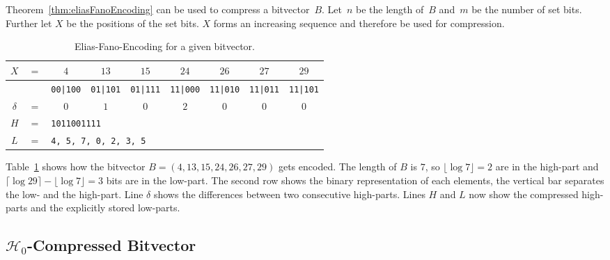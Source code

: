 Theorem~\ref{thm:eliasFanoEncoding} can be used to compress a bitvector~$B$. Let~$n$ be the length of~$B$ and~$m$ be the number of set bits. Further let $X$ be the positions of the set bits. $X$ forms an increasing sequence and therefore be used for compression.

\begin{Example}
  \begin{table}[htbp]
    \centering
    \begin{tabular}{ccccccccc}
      \toprule
      $X$ & $=$ & $4$ & $13$ & $15$ & $24$ & $26$ & $27$ & $29$ \\
      \midrule
      & &
      \texttt{00|100} &
      \texttt{01|101} &
      \texttt{01|111} &
      \texttt{11|000} &
      \texttt{11|010} &
      \texttt{11|011} &
      \texttt{11|101} \\

      $\delta$ & $=$ & $0$ & $1$ & $0$ & $2$ & $0$ & $0$ & $0$ \\
      $H$ & $=$ & \multicolumn{7}{l}{\texttt{1011001111}} \\
      $L$ & $=$ & \multicolumn{7}{l}{\texttt{4, 5, 7, 0, 2, 3, 5}} \\
      \bottomrule
    \end{tabular}
    \caption{Elias-Fano-Encoding for a given bitvector.}
    \label{tbl:eliasFanoExample}
  \end{table}
  Table~\ref{tbl:eliasFanoExample} shows how the bitvector $B=(4,13,15,24,26,27,29)$ gets encoded. The length of $B$ is $7$, so $\lfloor \log 7 \rfloor = 2$ are in the high-part and $\lceil \log 29 \rceil - \lfloor \log 7 \rfloor = 3$ bits are in the low-part. The second row shows the binary representation of each elements, the vertical bar separates the low- and the high-part. Line $\delta$ shows the differences between two consecutive high-parts. Lines $H$ and $L$ now show the compressed high-parts and the explicitly stored low-parts.
\end{Example}

\subsection{$\mathcal{H}_0$-Compressed Bitvector}
